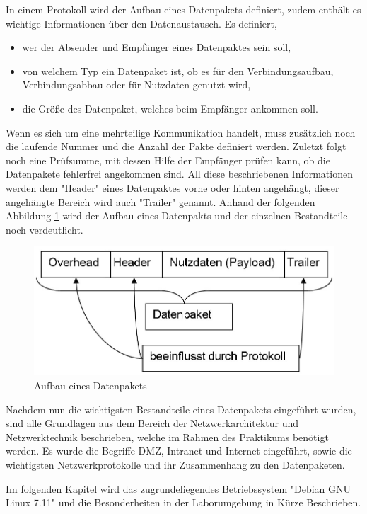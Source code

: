 \documentclass[
a4paper,     %
 headsepline, %
footsepline, %
titlepage,   %
 halfparskip,     %
 fleqn,       %
12pt         %
]{scrartcl}  %
\begin{document}
In einem Protokoll wird der Aufbau eines Datenpakets definiert, zudem enthält es wichtige Informationen über den Datenaustausch. 
Es definiert, 
\begin{itemize}
\item wer der Absender und Empfänger eines Datenpaktes sein soll,
\item von welchem Typ ein Datenpaket ist, ob es für den Verbindungsaufbau, Verbindungsabbau oder für Nutzdaten genutzt wird, 
\item die Größe des Datenpaket, welches beim Empfänger ankommen soll. 
\end{itemize}
Wenn es sich um eine mehrteilige Kommunikation handelt, muss zusätzlich noch die laufende Nummer und die Anzahl der Pakte definiert werden. Zuletzt folgt noch eine Prüfsumme, mit dessen Hilfe der Empfänger prüfen kann, ob die Datenpakete fehlerfrei angekommen sind. 
All diese beschriebenen Informationen werden dem "Header" eines Datenpaktes vorne oder hinten angehängt, dieser angehängte Bereich wird auch "Trailer" genannt. Anhand der folgenden Abbildung \ref{fig:datenpaket} wird der Aufbau eines Datenpakts und der einzelnen Bestandteile noch verdeutlicht. 
\begin{figure}[!h]
	\includegraphics[width=\textwidth]{pictures/datenpaket.png}
	\caption{Aufbau eines Datenpakets \cite{Header-Dat}}
	\label{fig:datenpaket}
\end{figure}

Nachdem nun die wichtigsten Bestandteile eines Datenpakets eingeführt wurden, sind alle Grundlagen aus dem Bereich der Netzwerkarchitektur und Netzwerktechnik beschrieben, welche im Rahmen des Praktikums benötigt werden. Es wurde die Begriffe DMZ, Intranet und Internet eingeführt, sowie die wichtigsten Netzwerkprotokolle und ihr Zusammenhang zu den Datenpaketen. 

Im folgenden Kapitel wird das zugrundeliegendes Betriebssystem "Debian GNU Linux 7.11" und die Besonderheiten in der Laborumgebung in Kürze Beschrieben.
\end{document}

